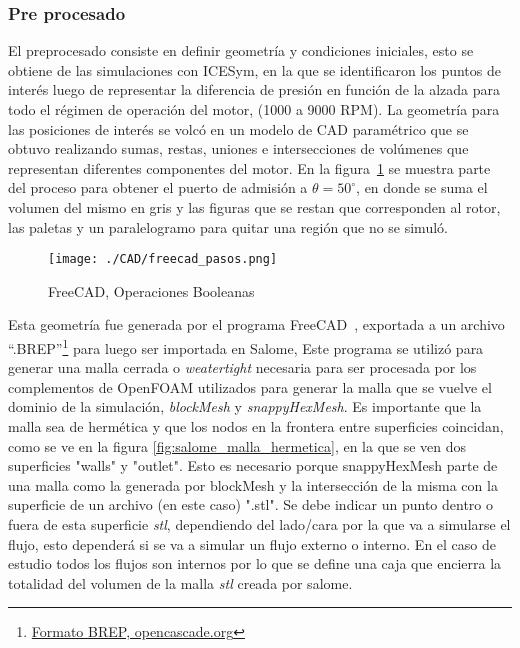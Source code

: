
\subsubsection{Pre procesado}
%
El preprocesado consiste en definir geometría y condiciones iniciales, esto se
obtiene de las simulaciones con ICESym, en la que se identificaron los puntos
de interés luego de representar la diferencia de presión en función de la
alzada para todo el régimen de operación del motor, (1000 a 9000 RPM).
%
%
La geometría para las posiciones de interés se volcó en un modelo de CAD
paramétrico que se obtuvo realizando sumas, restas, uniones e intersecciones de
volúmenes que representan diferentes componentes del motor.
%
En la figura~\ref{fig:admision_50} se muestra parte del proceso para obtener el
puerto de admisión a $\theta=50^{\circ}$, en donde se suma el volumen del mismo
en gris y las figuras que se restan que corresponden al rotor, las paletas y un
paralelogramo para quitar una región que no se simuló.

\begin{figure}
    \centering
    \texttt{[image: ./CAD/freecad\_pasos.png]}
    \caption{FreeCAD, Operaciones Booleanas}\label{fig:admision_50}
\end{figure}

Esta geometría fue generada por el programa FreeCAD~\parencite{freecad},
exportada a un archivo
``.BREP''\footnote{\href{https://dev.opencascade.org/doc/overview/html/specification\_\_brep\_format.html}{Formato
BREP, opencascade.org}} para luego ser importada en Salome\parencite{salome},
%
Este programa se utilizó para generar una malla cerrada o  \emph{weatertight}
necesaria para ser procesada por los complementos de OpenFOAM utilizados para
generar la malla que se vuelve el dominio de la simulación, \emph{blockMesh} y
\emph{snappyHexMesh}.
%
Es importante que la malla sea de hermética y que los nodos en la frontera
entre superficies coincidan, como se ve en la figura
\ref{fig:salome_malla_hermetica}, en la que se ven dos superficies "walls" y
"outlet".
%
Esto es necesario porque snappyHexMesh parte de una malla como la generada por
blockMesh y la intersección de la misma con la superficie de un archivo (en
este caso) ".stl".
%
Se debe indicar un punto dentro o fuera de esta superficie \emph{stl},
dependiendo del lado/cara por la que va a simularse el flujo, esto dependerá si
se va a simular un flujo externo o interno.
%
En el caso de estudio todos los flujos son internos por lo que se define una
caja que encierra la totalidad del volumen de la malla \emph{stl} creada por
salome.

